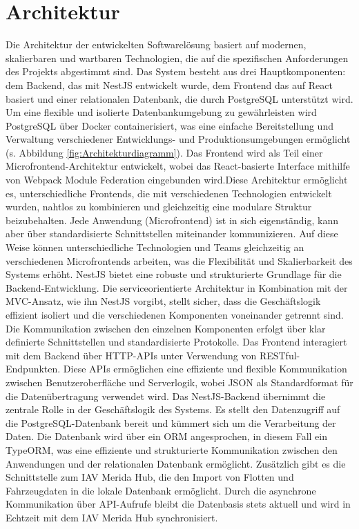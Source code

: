\section{Architektur}
Die Architektur der entwickelten Softwarelösung basiert auf modernen, skalierbaren und wartbaren Technologien, die auf die spezifischen Anforderungen des Projekts abgestimmt sind. Das System besteht aus drei Hauptkomponenten: dem Backend, das mit NestJS entwickelt wurde, dem Frontend das auf React basiert und einer relationalen Datenbank, die durch PostgreSQL unterstützt wird. Um eine flexible und isolierte Datenbankumgebung zu gewährleisten wird PostgreSQL über Docker containerisiert, was eine einfache Bereitstellung und Verwaltung verschiedener Entwicklungs- und Produktionsumgebungen ermöglicht (s. Abbildung \ref{fig:Architekturdiagramm}). 
\newline
\newline
Das Frontend wird als Teil einer Microfrontend-Architektur entwickelt, wobei das React-basierte Interface mithilfe von Webpack Module Federation eingebunden wird.Diese Architektur ermöglicht es, unterschiedliche Frontends, die mit verschiedenen Technologien entwickelt wurden, nahtlos zu kombinieren und gleichzeitig eine modulare Struktur beizubehalten. Jede Anwendung (Microfrontend) ist in sich eigenständig, kann aber über standardisierte Schnittstellen miteinander kommunizieren. Auf diese Weise können unterschiedliche Technologien und Teams gleichzeitig an verschiedenen Microfrontends arbeiten, was die Flexibilität und Skalierbarkeit des Systems erhöht.
\newline
\newline
NestJS bietet eine robuste und strukturierte Grundlage für die Backend-Entwicklung. Die serviceorientierte Architektur in Kombination mit der \ac{MVC}-Ansatz, wie ihn NestJS vorgibt, stellt sicher, dass die Geschäftslogik effizient isoliert und die verschiedenen Komponenten voneinander getrennt sind.
\newline
Die Kommunikation zwischen den einzelnen Komponenten erfolgt über klar definierte Schnittstellen und standardisierte Protokolle. Das Frontend interagiert mit dem Backend über HTTP-APIs unter Verwendung von RESTful-Endpunkten. Diese APIs ermöglichen eine effiziente und flexible Kommunikation zwischen Benutzeroberfläche und Serverlogik, wobei JSON als Standardformat für die Datenübertragung verwendet wird.
\newline
Das NestJS-Backend übernimmt die zentrale Rolle in der Geschäftslogik des Systems. Es stellt den Datenzugriff auf die PostgreSQL-Datenbank bereit und kümmert sich um die Verarbeitung der Daten. Die Datenbank wird über ein \ac{ORM} angesprochen, in diesem Fall ein TypeORM, was eine effiziente und strukturierte Kommunikation zwischen den Anwendungen und der relationalen Datenbank ermöglicht. Zusätzlich gibt es die Schnittstelle zum IAV Merida Hub, die den Import von Flotten und Fahrzeugdaten in die lokale Datenbank ermöglicht. Durch die asynchrone Kommunikation über API-Aufrufe bleibt die Datenbasis stets aktuell und wird in Echtzeit mit dem IAV Merida Hub synchronisiert.
